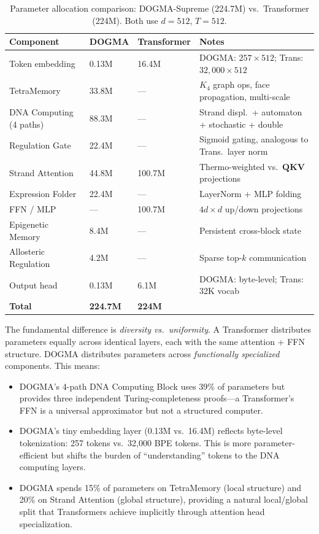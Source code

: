 \begin{table}[H]
\centering
\caption{Parameter allocation comparison: DOGMA-Supreme (224.7M) vs.\ Transformer (224M). Both use $d=512$, $T=512$.}
\label{tab:param-allocation}
\renewcommand{\arraystretch}{1.15}
\begin{tabularx}{0.95\textwidth}{L{4cm} C{2.5cm} C{2.5cm} Y}
\toprule
\textbf{Component} & \textbf{DOGMA} & \textbf{Transformer} & \textbf{Notes} \\
\midrule
Token embedding & 0.13M & 16.4M & DOGMA: $257 \times 512$; Trans: $32{,}000 \times 512$ \\
TetraMemory & 33.8M & --- & $K_4$ graph ops, face propagation, multi-scale \\
DNA Computing (4 paths) & 88.3M & --- & Strand displ.\ + automaton + stochastic + double \\
Regulation Gate & 22.4M & --- & Sigmoid gating, analogous to Trans.\ layer norm \\
Strand Attention & 44.8M & 100.7M & Thermo-weighted vs.\ $\mathbf{QKV}$ projections \\
Expression Folder & 22.4M & --- & LayerNorm + MLP folding \\
FFN / MLP & --- & 100.7M & $4d \times d$ up/down projections \\
Epigenetic Memory & 8.4M & --- & Persistent cross-block state \\
Allosteric Regulation & 4.2M & --- & Sparse top-$k$ communication \\
Output head & 0.13M & 6.1M & DOGMA: byte-level; Trans: 32K vocab \\
\midrule
\textbf{Total} & \textbf{224.7M} & \textbf{224M} & \\
\bottomrule
\end{tabularx}
\end{table}

\begin{keyinsight}
The fundamental difference is \emph{diversity vs.\ uniformity}. A Transformer distributes parameters equally across identical layers, each with the same attention + FFN structure. DOGMA distributes parameters across \emph{functionally specialized} components. This means:
\begin{itemize}[leftmargin=1.5em]
  \item DOGMA's 4-path DNA Computing Block uses 39\% of parameters but provides three independent Turing-completeness proofs---a Transformer's FFN is a universal approximator but not a structured computer.
  \item DOGMA's tiny embedding layer (0.13M vs.\ 16.4M) reflects byte-level tokenization: 257 tokens vs.\ 32,000 BPE tokens. This is more parameter-efficient but shifts the burden of ``understanding'' tokens to the DNA computing layers.
  \item DOGMA spends 15\% of parameters on TetraMemory (local structure) and 20\% on Strand Attention (global structure), providing a natural local/global split that Transformers achieve implicitly through attention head specialization.
\end{itemize}
\end{keyinsight}

